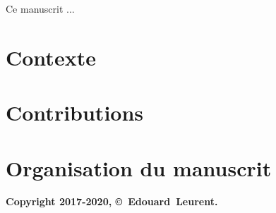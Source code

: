 \begin{resume_fr}



Ce manuscrit ...

\section*{Contexte}

\section*{Contributions}

\section*{Organisation du manuscrit}


%
%


\begin{center}
    \textbf{Copyright 2017-2020, \copyright ~Edouard~Leurent.}
\end{center}


\end{resume_fr}
